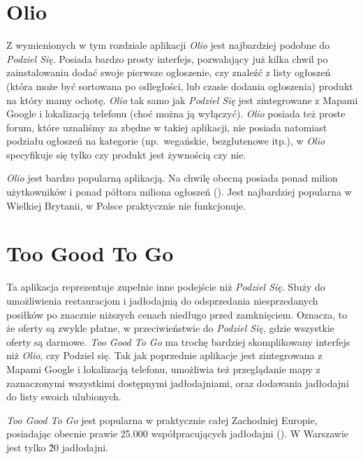\documentclass[licencjacka]{pracamgr}
\begin{document}
\section{Olio}
Z wymienionych w tym rozdziale aplikacji \textit{Olio} jest najbardziej podobne do \textit{Podziel Się}. Posiada bardzo prosty interfejs, pozwalający już kilka chwil po zainstalowaniu dodać swoje pierwsze ogłoszenie, czy znaleźć z listy ogłoszeń (która może być sortowana po odległości, lub czasie dodania ogłoszenia) produkt na który mamy ochotę. \textit{Olio} tak samo jak \textit{Podziel Się} jest zintegrowane z Mapami Google i lokalizacją telefonu (choć można ją wyłączyć). \textit{Olio} posiada też proste forum, które uznaliśmy za zbędne w takiej aplikacji, nie posiada natomiast podziału ogłoszeń na kategorie (np.\ wegańskie, bezglutenowe itp.), w \textit{Olio} specyfikuje się tylko czy produkt jest żywnością czy nie.

\textit{Olio} jest bardzo popularną aplikacją. Na chwilę obecną posiada ponad milion użytkowników i ponad półtora miliona ogłoszeń (\cite{olio}). Jest najbardziej popularna w Wielkiej Brytanii, w Polsce praktycznie nie funkcjonuje.

\section{Too Good To Go}
Ta aplikacja reprezentuje zupełnie inne podejście niż \textit{Podziel Się}. Służy do umożliwienia restauracjom i jadłodajnią do odsprzedania niesprzedanych posiłków po znacznie niższych cenach niedługo przed zamknięciem. Oznacza, to że oferty są zwykle płatne, w przeciwieństwie do \textit{Podziel Się}, gdzie wszystkie oferty są darmowe. \textit{Too Good To Go} ma trochę bardziej skomplikowany interfejs niż \textit{Olio}, czy Podziel się. Tak jak poprzednie aplikacje jest zintegrowana z Mapami Google i lokalizacją telefonu, umożliwia też przeglądanie mapy z zaznaczonymi wszystkimi dostępnymi jadłodajniami, oraz dodawania jadłodajni do listy swoich ulubionych.

\textit{Too Good To Go} jest popularna w praktycznie całej Zachodniej Europie, posiadając obecnie prawie 25.000 współpracujących jadłodajni (\cite{tgtg}). W Warszawie jest tylko \~20 jadłodajni.
\end{document}
